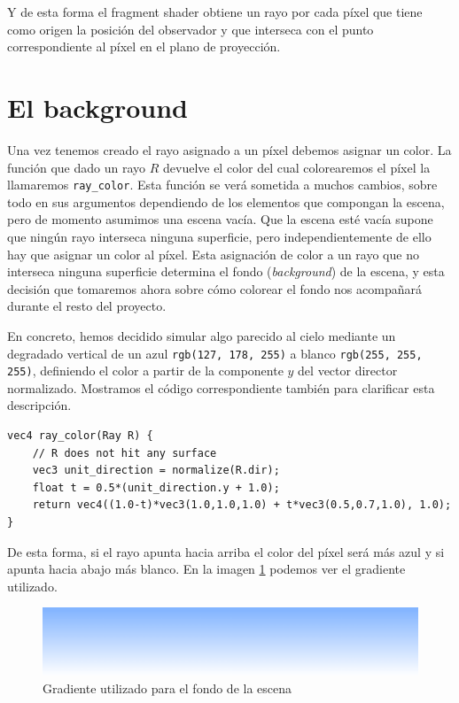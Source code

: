 Y de esta forma el fragment shader obtiene un rayo por cada píxel que tiene como origen la posición del observador y que interseca con el punto correspondiente al píxel en el plano de proyección.

\section{El background}

Una vez tenemos creado el rayo asignado a un píxel debemos asignar un color. La función que dado un rayo $R$ devuelve el color del cual colorearemos el píxel la llamaremos \verb|ray_color|. Esta función se verá sometida a muchos cambios, sobre todo en sus argumentos dependiendo de los elementos que compongan la escena, pero de momento asumimos una escena vacía. Que la escena esté vacía supone que ningún rayo interseca ninguna superficie, pero independientemente de ello hay que asignar un color al píxel. Esta asignación de color a un rayo que no interseca ninguna superficie determina el fondo (\textit{background}) de la escena, y esta decisión que tomaremos ahora sobre cómo colorear el fondo nos acompañará durante el resto del proyecto. 

En concreto, hemos decidido simular algo parecido al cielo mediante un degradado vertical de un \textcolor{background-blue}{azul} \verb|rgb(127, 178, 255)| a blanco \verb|rgb(255, 255, 255)|, definiendo el color a partir de la componente $y$ del vector director normalizado. Mostramos el código correspondiente también para clarificar esta descripción.

\begin{lstlisting}
vec4 ray_color(Ray R) {
    // R does not hit any surface
    vec3 unit_direction = normalize(R.dir);
    float t = 0.5*(unit_direction.y + 1.0);
    return vec4((1.0-t)*vec3(1.0,1.0,1.0) + t*vec3(0.5,0.7,1.0), 1.0);
}
\end{lstlisting}

De esta forma, si el rayo apunta hacia arriba el color del píxel será más azul y si apunta hacia abajo más blanco. En la imagen \ref{fig:background} podemos ver el gradiente utilizado.

\begin{figure} [ht]
    \centering
    \includegraphics[scale = 0.35]{img/C7/background-gradient.png}
    \caption{Gradiente utilizado para el fondo de la escena}
    \label{fig:background}
\end{figure}

